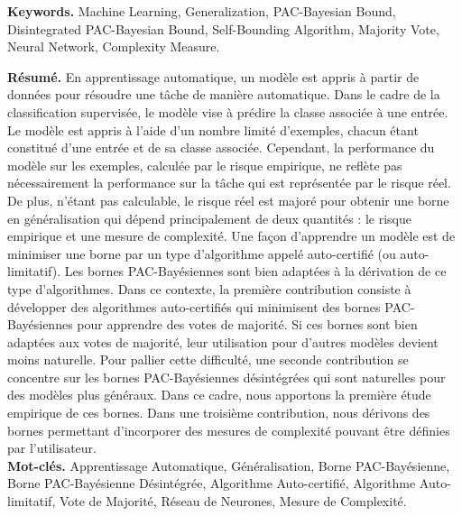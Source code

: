 \textbf{\small Keywords.} {\footnotesize Machine Learning, Generalization, PAC-Bayesian Bound, Disintegrated PAC-Bayesian Bound, Self-Bounding Algorithm, Majority Vote, Neural Network, Complexity Measure.}\\

\vfill

\textbf{\small Résumé.} {\footnotesize En apprentissage automatique, un modèle est appris à partir de données pour résoudre une tâche de manière automatique. Dans le cadre de la classification supervisée, le modèle vise à prédire la classe associée à une entrée. Le modèle est appris à l'aide d'un nombre limité d'exemples, chacun étant constitué d'une entrée et de sa classe associée. Cependant, la performance du modèle sur les exemples, calculée par le risque empirique, ne reflète pas nécessairement la performance sur la tâche qui est représentée par le risque réel. De plus, n'étant pas calculable, le risque réel est majoré pour obtenir une borne en généralisation qui dépend principalement de deux quantités : le risque empirique et une mesure de complexité. Une façon d'apprendre un modèle est de minimiser une borne par un type d'algorithme appelé auto-certifié (ou auto-limitatif). Les bornes PAC-Bayésiennes sont bien adaptées à la dérivation de ce type d'algorithmes. Dans ce contexte, la première contribution consiste à développer des algorithmes auto-certifiés qui minimisent des bornes PAC-Bayésiennes pour apprendre des votes de majorité. Si ces bornes sont bien adaptées aux votes de majorité, leur utilisation pour d'autres modèles devient moins naturelle. Pour pallier cette difficulté, une seconde contribution se concentre sur les bornes PAC-Bayésiennes désintégrées qui sont naturelles pour des modèles plus généraux. Dans ce cadre, nous apportons la première étude empirique de ces bornes. Dans une troisième contribution, nous dérivons des bornes permettant d'incorporer des mesures de complexité pouvant être définies par l'utilisateur.
}\\

\textbf{Mot-clés.} {\footnotesize Apprentissage Automatique, Généralisation, Borne PAC-Bayésienne, Borne PAC-Bayésienne Désintégrée, Algorithme Auto-certifié, Algorithme  Auto-limitatif, Vote de Majorité, Réseau de Neurones, Mesure de Complexité.}
